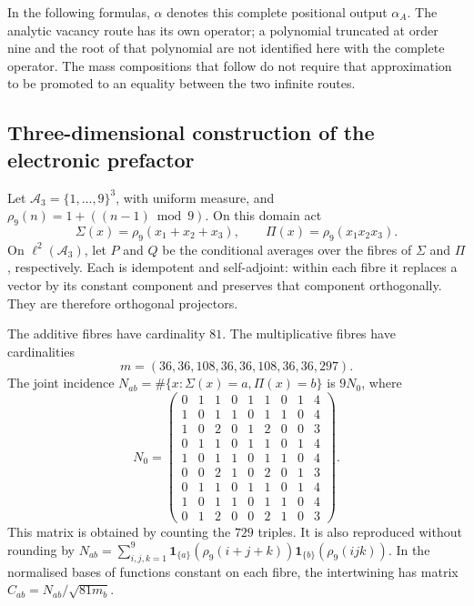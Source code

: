 In the following formulas, \(\alpha\) denotes this complete positional
output \(\alpha_A\). The analytic vacancy route has its own
operator; a polynomial truncated at order nine and the root of that polynomial
are not identified here with the complete operator. The mass
compositions that follow do not require that approximation to be promoted to an
equality between the two infinite routes.

\subsection{Three-dimensional construction of the electronic prefactor}
\label{vi:vi:dep:prefactor}

Let \(\mathcal A_3=\{1,\ldots,9\}^3\), with uniform measure, and
\(\rho_9(n)=1+((n-1)\bmod9)\). On this domain act
\[
 \Sigma(x)=\rho_9(x_1+x_2+x_3),\qquad
 \Pi(x)=\rho_9(x_1x_2x_3).
\]
On \(\ell^2(\mathcal A_3)\), let \(P\) and \(Q\) be the conditional
averages over the fibres of \(\Sigma\) and \(\Pi\),
respectively. Each is idempotent and self-adjoint: within each
fibre it replaces a vector by its constant component and preserves
that component orthogonally. They are therefore orthogonal projectors.

The additive fibres have cardinality \(81\). The multiplicative fibres have
cardinalities
\[
m=(36,36,108,36,36,108,36,36,297).
\]
The joint incidence
\(N_{ab}=\#\{x:\Sigma(x)=a,\Pi(x)=b\}\) is \(9N_0\), where
\begin{equation}
 N_0=\begin{pmatrix}
0&1&1&0&1&1&0&1&4\\1&0&1&1&0&1&1&0&4\\
1&0&2&0&1&2&0&0&3\\0&1&1&0&1&1&0&1&4\\
1&0&1&1&0&1&1&0&4\\0&0&2&1&0&2&0&1&3\\
0&1&1&0&1&1&0&1&4\\1&0&1&1&0&1&1&0&4\\
0&1&2&0&0&2&1&0&3
\end{pmatrix}.
 \label{vi:vi:dep:incidencia-cubica}
\end{equation}
This matrix is obtained by counting the \(729\) triples. It is also
reproduced without rounding by
\(N_{ab}=\sum_{i,j,k=1}^9
\mathbf1_{\{a\}}(\rho_9(i+j+k))
\mathbf1_{\{b\}}(\rho_9(ijk))\).
In the normalised bases of functions constant on each fibre, the
intertwining has matrix \(C_{ab}=N_{ab}/\sqrt{81m_b}\).

